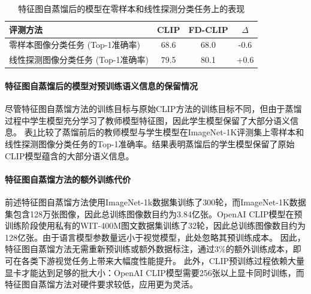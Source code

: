
\begin{table}
\caption{特征图自蒸馏后的模型在零样本和线性探测分类任务上的表现
}
\centering
  \begin{tabular}{lccc}
\toprule
  评测方法 & CLIP & FD-CLIP & $\Delta$ \\
  \midrule
  零样本图像分类任务 (Top-1准确率) & 68.6 & 68.0 & -0.6 \\
  线性探测图像分类任务 (Top-1准确率) & 79.5 & 80.1 & +0.6 \\ 
\bottomrule
  \end{tabular}
\label{tab:fd-zero_shot}
\end{table}

\paragraph{特征图自蒸馏后的模型对预训练语义信息的保留情况} 
尽管特征图自蒸馏方法的训练目标与原始CLIP方法的训练目标不同，但由于蒸馏过程中学生模型充分学习了教师模型特征图，因此学生模型保留了大部分语义信息。
表\ref{tab:fd-zero_shot}比较了蒸馏前后的教师模型与学生模型在ImageNet-1K评测集上零样本和线性探测图像分类任务的Top-1准确率。结果表明蒸馏后的学生模型保留了原始CLIP模型蕴含的大部分语义信息。

\paragraph{特征图自蒸馏方法的额外训练代价} 前述特征图自蒸馏方法使用ImageNet-1k数据集训练了300轮，而ImageNet-1K数据集包含128万张图像，因此总训练图像数目约为3.84亿张。OpenAI CLIP模型在预训练阶段使用私有的WIT-400M图文数据集\cite{radford2021learning}训练了32轮，因此总训练图像数目约为128亿张。由于语言模型参数量远小于视觉模型，此处忽略其预训练成本。
因此，特征图自蒸馏方法无需重新预训练或额外数据标注，通过3\%的额外训练成本，即可在各类下游视觉任务上带来大幅度性能提升。
此外，CLIP预训练过程依赖大量显卡才能达到足够的批大小：OpenAI CLIP模型需要256张以上显卡同时训练，而特征图自蒸馏方法对硬件要求较低，应用更为灵活。%


